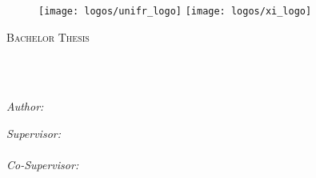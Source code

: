 

\begin{titlepage}
\begin{center}


\begin{figure}
  \centering
    \texttt{[image: logos/unifr\_logo]}
  \hfill
    \texttt{[image: logos/xi\_logo]}
  \vspace{30mm}
\end{figure}

{\scshape\LARGE \univname\par}\vspace{1.5cm} %
\textsc{\Large Bachelor Thesis}\\[0.5cm] %
\HRule \\[0.4cm] %
{\huge \bfseries \ttitle\par}\vspace{0.4cm} %
\HRule \\[1.5cm] %

\begin{minipage}[t]{0.4\textwidth}
\begin{flushleft} \large
\emph{Author:}\\
\href{mailto://mattias.duerrmeier@unifr.ch}{\authorname} %
\end{flushleft}
\end{minipage}
\begin{minipage}[t]{0.4\textwidth}
\begin{flushright} \large
\emph{Supervisor:} \\
\href{https://exascale.info/phil}{\supname} %
\\\vspace*{1ex}\emph{Co-Supervisor:} \\ %
\href{https://exascale.info/members/}{\cosupname} %
\end{flushright}
\end{minipage}\\[1cm]


\end{center}
\end{titlepage}

